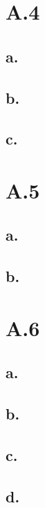 \documentclass{article}
\newcommand{\1}{\mathbf{1}}
\begin{document}
\section*{A.4}
{\Large 

\subsection*{a.}

\subsection*{b.}

\subsection*{c.}

}

\section*{A.5}
{\Large 

\subsection*{a.}

\subsection*{b.}

}

\section*{A.6}
{\Large 

\subsection*{a.}

\subsection*{b.}

\subsection*{c.}

\subsection*{d.}

}
\end{document}
